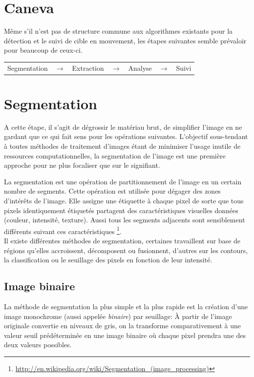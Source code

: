 \documentclass[a4paper,12pt]{report}
\begin{document}
\section{Caneva}
Même s'il n'est pas de structure commune aux algorithmes existants pour la détection et le suivi de cible en mouvement, les étapes suivantes semble prévaloir pour beaucoup de ceux-ci.\\
\begin{center}
\begin{tabular}{ c c c c c c c } 
\cellcolor[gray]{0.9} Segmentation & $\rightarrow$ & \cellcolor[gray]{0.9} Extraction & $\rightarrow$ & \cellcolor[gray]{0.9} Analyse & $\rightarrow$ & \cellcolor[gray]{0.9} Suivi\\  
\end{tabular} 
\end{center}

\section{Segmentation}
A cette étape, il s'agit de dégrossir le matériau brut, de simplifier l'image en ne gardant que ce qui fait sens pour les opérations suivantes. L'objectif sous-tendant à toutes méthodes de traitement d'images étant de minimiser l'usage inutile de ressources computationnelles, la segmentation de l'image est une première approche pour ne plus focaliser que sur le signifiant. 

La segmentation est une opération de partitionnement de l'image en un certain nombre de segments. Cette opération est utilisée pour dégager des zones d'intérêts de l'image. Elle assigne une étiquette à chaque pixel de sorte que tous pixels identiquement étiquetés partagent des caractéristiques visuelles données (couleur, intensité, texture). Aussi tous les segments adjacents sont sensiblement différents suivant ces caractéristiques \footnote{\url{http://en.wikipedia.org/wiki/Segmentation_(image_processing)}}.\\

Il existe différentes méthodes de segmentation, certaines travaillent sur base de régions qu'elles accroissent, décomposent ou fusionnent, d'autres sur les contours, la classification ou le seuillage des pixels en fonction de leur intensité.\\
\subsection{Image binaire}
La méthode de segmentation la plus simple et la plus rapide est la création d'une image monochrome (aussi appelée \textit{binaire}) par seuillage: \`A partir de l'image originale convertie en niveaux de gris, on la transforme comparativement à une valeur seuil prédéterminée en une image binaire où chaque pixel prendra une des deux valeurs possibles.\\
\end{document}
